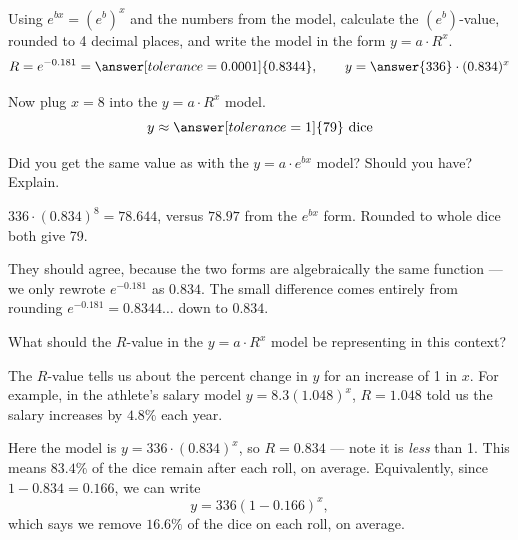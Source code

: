 \documentclass[12pt]{ximera}
\begin{document}
\begin{problem}
Using $e^{bx} = \left(e^{b}\right)^{x}$ and the numbers from the model, calculate the
$\left(e^{b}\right)$-value, rounded to 4 decimal places, and write the model in the
form $y = a \cdot R^{x}$.
\[
R = e^{-0.181} = \answer[tolerance=0.0001]{0.8344},
\qquad
y = \answer{336} \cdot (0.834)^{x}
\]
\end{problem}

\begin{problem}
Now plug $x = 8$ into the $y = a \cdot R^{x}$ model.
\[
y \approx \answer[tolerance=1]{79} \text{ dice}
\]

Did you get the same value as with the $y = a \cdot e^{bx}$ model? Should you have?
Explain.

\begin{freeResponse}
\end{freeResponse}

\begin{solution}
$336 \cdot (0.834)^{8} = 78.644$, versus $78.97$ from the $e^{bx}$ form. Rounded to
whole dice both give 79.

They should agree, because the two forms are algebraically the same function --- we
only rewrote $e^{-0.181}$ as $0.834$. The small difference comes entirely from
rounding $e^{-0.181} = 0.8344\ldots$ down to $0.834$.
\end{solution}
\end{problem}

\begin{problem}
What should the $R$-value in the $y = a \cdot R^{x}$ model be representing in this
context?

\begin{freeResponse}
\end{freeResponse}

\begin{solution}
The $R$-value tells us about the percent change in $y$ for an increase of 1 in $x$.
For example, in the athlete's salary model $y = 8.3(1.048)^{x}$, $R = 1.048$ told us
the salary increases by $4.8\%$ each year.

Here the model is $y = 336 \cdot (0.834)^{x}$, so $R = 0.834$ --- note it is
\emph{less} than 1. This means $83.4\%$ of the dice remain after each roll, on
average. Equivalently, since $1 - 0.834 = 0.166$, we can write
\[
y = 336(1 - 0.166)^{x},
\]
which says we remove $16.6\%$ of the dice on each roll, on average.
\end{solution}
\end{problem}
\end{document}
